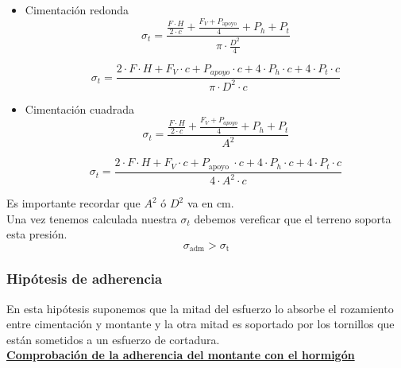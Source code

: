 \documentclass{article}
\begin{document}
{            \begin{itemize}
                        \item Cimentación redonda
                        \begin{equation*}
              \sigma_{t}=\frac{\frac{F \cdot H}{2 \cdot c}+\frac{F_{V}+P_{\text {apoyo }}}{4}+P_{h}+P_{t}}{\pi \cdot \frac{D^{2}}{4}}
            \end{equation*}
            
            
            \begin{equation*}
                \sigma_{t}=\frac{2 \cdot F \cdot H+F_{V} \cdot c+P_{a p o y o} \cdot c+4 \cdot P_{h} \cdot c+4 \cdot P_{t} \cdot c}{\pi \cdot D^{2} \cdot c}
            \end{equation*}
                        \item Cimentación cuadrada
                         \begin{equation*}
                             \sigma_{t}=\frac{\frac{F \cdot H}{2 \cdot c}+\frac{F_{V}+P_{a p o y o}}{4}+P_{h}+P_{t}}{A^{2}}
                         \end{equation*}
                         
                         \begin{equation*}
                             \sigma_{t}=\frac{2 \cdot F \cdot H+F_{V} \cdot c+P_{\text {apoyo }} \cdot c+4 \cdot P_{h} \cdot c+4 \cdot P_{t} \cdot c}{4 \cdot A^{2} \cdot c}
                         \end{equation*}
                    \end{itemize}
            } 
            Es importante recordar que $A^2$ ó $D^2$ va en cm.
            \\
            
            Una vez tenemos calculada nuestra $\sigma_t$ debemos vereficar que el terreno soporta esta presión.
            $$
            \sigma_{\mathrm{adm}}>\sigma_{\mathrm{t}}
            $$
            \newpage
            \subsubsection{Hipótesis de adherencia}
            En esta hipótesis suponemos que la mitad del esfuerzo lo absorbe el rozamiento entre cimentación y montante y la otra mitad es soportado por los tornillos que están sometidos a un esfuerzo de cortadura.
            \\
            
            \textbf{\underline{Comprobación de la adherencia del montante con el hormigón}} 
            \\
            
\end{document}
